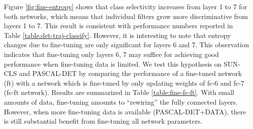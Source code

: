 Figure \ref{fig:fine-entropy} shows that class selectivity increases from layer 1 to 7 for both networks, which means that individual filters grow more discriminative from layers 1 to 7.
This result is consistent with performance numbers reported in Table \ref{table:det-traj-classify}. 
However, it is interesting to note that entropy changes due to fine-tuning are only significant for layers 6 and 7. 
This observation indicates that fine-tuning only layers 6, 7 may suffice for achieving good performance when fine-tuning data is limited. 
We test this hypothesis on SUN-CLS and PASCAL-DET by comparing the performance of a fine-tuned network (ft) with a network which is fine-tuned by only updating weights of fc-6 and fc-7 (fc-ft network). 
Results are summarized in Table \ref{table:fine-fc-ft}.
With small amounts of data, fine-tuning amounts to ``rewiring'' the fully connected layers.
However, when more fine-tuning data is available (PASCAL-DET+DATA), there is still substantial benefit from fine-tuning all network parameters.

\setlength{\tabcolsep}{2pt}
\begin{table}[t!]
\begin{center}
\caption{Comparison in performance when fine-tuning the entire network (ft) versus only fine-tuning the fully-connected layers (fc-ft).}
\label{table:fine-fc-ft}
\vspace{0.3em}
\end{center}
\end{table}
\setlength{\tabcolsep}{1.4pt}


